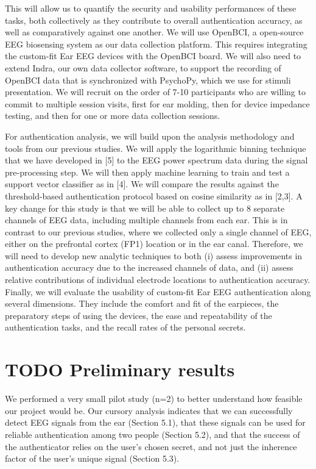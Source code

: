 \documentclass[11pt]{article}
\begin{document}
This will allow us to quantify the security and usability performances of these
tasks, both collectively as they contribute to overall authentication accuracy, as
well as comparatively against one another.
We will use OpenBCI, a open-source EEG biosensing system as our data
collection platform. This requires integrating the custom-fit Ear EEG devices with
the OpenBCI board. We will also need to extend Indra, our own data collector
software, to support the recording of OpenBCI data that is synchronized with
PsychoPy, which we use for stimuli presentation. We will recruit on the order of
7-10 participants who are willing to commit to multiple session visits, first for ear
molding, then for device impedance testing, and then for one or more data
collection sessions.

For authentication analysis, we will build upon the analysis methodology and
tools from our previous studies. We will apply the logarithmic binning technique
that we have developed in [5] to the EEG power spectrum data during the signal
pre-processing step. We will then apply machine learning to train and test a
support vector classifier as in [4]. We will compare the results against the
threshold-based authentication protocol based on cosine similarity as in [2,3].
A key change for this study is that we will be able to collect up to 8 separate
channels of EEG data, including multiple channels from each ear. This is in
contrast to our previous studies, where we collected only a single channel of
EEG, either on the prefrontal cortex (FP1) location or in the ear canal. Therefore,
we will need to develop new analytic techniques to both (i) assess improvements
in authentication accuracy due to the increased channels of data, and (ii) assess
relative contributions of individual electrode locations to authentication accuracy.
Finally, we will evaluate the usability of custom-fit Ear EEG authentication along
several dimensions. They include the comfort and fit of the earpieces, the
preparatory steps of using the devices, the ease and repeatability of the
authentication tasks, and the recall rates of the personal secrets.
\section{{\bfseries\sffamily TODO} Preliminary results}
\label{sec:org9310aa7}

We performed a very small pilot study (n=2) to better understand how feasible 
our project would be. Our cursory analysis indicates that we can successfully
detect EEG signals from the ear (Section 5.1), that these signals can be used
for reliable authentication among two people (Section 5.2), and that the success
of the authenticator relies on the user's chosen secret, and not just the inherence
factor of the user's unique signal (Section 5.3).
\end{document}
